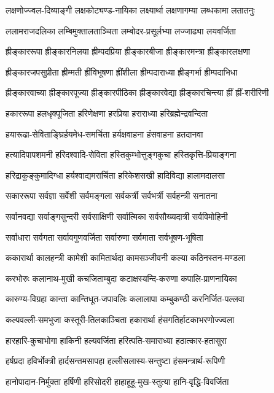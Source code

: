 \twolineshloka
{लक्षणोज्ज्वल-दिव्याङ्गी लक्षकोट्यण्ड-नायिका}
{लक्ष्यार्था लक्षणागम्या लब्धकामा लतातनुः}

\twolineshloka
{ललामराजदलिका लम्बिमुक्तालताञ्चिता}
{लम्बोदर-प्रसूर्लभ्या लज्जाढ्या लयवर्जिता}

\twolineshloka
{ह्रीङ्काररूपा ह्रीङ्कारनिलया ह्रीम्पदप्रिया}
{ह्रीङ्कारबीजा ह्रीङ्कारमन्त्रा ह्रीङ्कारलक्षणा}

\twolineshloka
{ह्रीङ्कारजपसुप्रीता ह्रीम्मती ह्रींविभूषणा}
{ह्रींशीला ह्रीम्पदाराध्या ह्रीङ्गर्भा ह्रीम्पदाभिधा}

\twolineshloka
{ह्रीङ्कारवाच्या ह्रीङ्कारपूज्या ह्रीङ्कारपीठिका}
{ह्रीङ्कारवेद्या ह्रीङ्कारचिन्त्या ह्रीं ह्रीं-शरीरिणी}

\twolineshloka
{हकाररूपा हलधृक्पूजिता हरिणेक्षणा}
{हरप्रिया हराराध्या हरिब्रह्मेन्द्रवन्दिता}

\twolineshloka
{हयारूढा-सेविताङ्घ्रिर्हयमेध-समर्चिता}
{हर्यक्षवाहना हंसवाहना हतदानवा}

\twolineshloka
{हत्यादिपापशमनी हरिदश्वादि-सेविता}
{हस्तिकुम्भोत्तुङ्गकुचा हस्तिकृत्ति-प्रियाङ्गना}

\twolineshloka
{हरिद्राकुङ्कुमादिग्धा हर्यश्वाद्यमरार्चिता}
{हरिकेशसखी हादिविद्या हालामदालसा}

\twolineshloka
{सकाररूपा सर्वज्ञा सर्वेशी सर्वमङ्गला}
{सर्वकर्त्री सर्वभर्त्री सर्वहन्त्री सनातना}

\twolineshloka
{सर्वानवद्या सर्वाङ्गसुन्दरी सर्वसाक्षिणी}
{सर्वात्मिका सर्वसौख्यदात्री सर्वविमोहिनी}

\twolineshloka
{सर्वाधारा सर्वगता सर्वावगुणवर्जिता}
{सर्वारुणा सर्वमाता सर्वभूषण-भूषिता}

\twolineshloka
{ककारार्था कालहन्त्री कामेशी कामितार्थदा}
{कामसञ्जीवनी कल्या कठिनस्तन-मण्डला}

\twolineshloka
{करभोरुः कलानाथ-मुखी कचजिताम्बुदा}
{कटाक्षस्यन्दि-करुणा कपालि-प्राणनायिका}

\twolineshloka
{कारुण्य-विग्रहा कान्ता कान्तिधूत-जपावलिः}
{कलालापा कम्बुकण्ठी करनिर्जित-पल्लवा}

\twolineshloka
{कल्पवल्ली-समभुजा कस्तूरी-तिलकाञ्चिता}
{हकारार्था हंसगतिर्हाटकाभरणोज्ज्वला}

\twolineshloka
{हारहारि-कुचाभोगा हाकिनी हल्यवर्जिता}
{हरित्पति-समाराध्या हठात्कार-हतासुरा}

\twolineshloka
{हर्षप्रदा हविर्भोक्त्री हार्दसन्तमसापहा}
{हल्लीसलास्य-सन्तुष्टा हंसमन्त्रार्थ-रूपिणी}

\twolineshloka
{हानोपादान-निर्मुक्ता हर्षिणी हरिसोदरी}
{हाहाहूहू-मुख-स्तुत्या हानि-वृद्धि-विवर्जिता}

